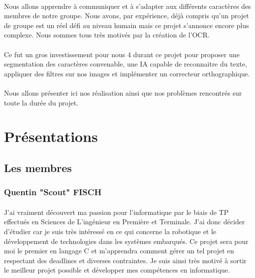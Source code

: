 \documentclass{article}
\begin{document}
	\paragraph{}
    Nous allons apprendre à communiquer et à s'adapter aux différents caractères des membres de notre groupe. Nous avons, par expérience, déjà compris qu'un projet de groupe est un réel défi au niveau humain mais ce projet s'annonce encore plus complexe.
    Nous sommes tous très motivés par la création de l'OCR.
	
	\paragraph{}
    Ce fut un gros investissement pour nous 4 durant ce projet pour proposer une segmentation des caractères convenable, une IA capable de reconnaitre du texte, appliquer des filtres sur nos images et implémenter un correcteur orthographique.

	\paragraph{}
    Nous allons présenter ici nos réalisation ainsi que nos problèmes rencontrés sur toute la durée du projet.

\newpage
{}
\vspace*{2cm}
\section{Présentations}
\subsection{Les membres}
\subsubsection{Quentin "Scout" FISCH}
\paragraph{}J'ai vraiment découvert ma passion pour l'informatique par le biais de TP effectués en Sciences de L'ingénieur en Première et Terminale. J'ai donc décider d'étudier car je suis très intéressé en ce qui concerne la robotique et le développement de technologies dans les systèmes embarqués. Ce projet sera pour moi le premier en langage C et m'apprendra comment gérer un tel projet en respectant des deadlines et diverses contraintes. Je suis ainsi très motivé à sortir le meilleur projet possible et développer mes compétences en informatique.
\end{document}
